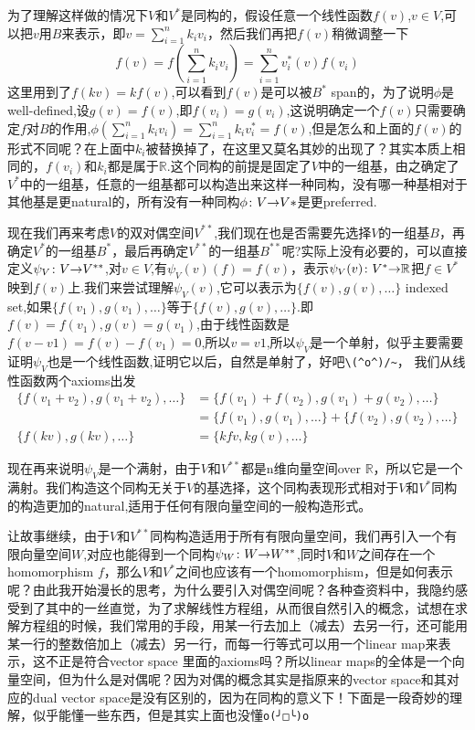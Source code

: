 \documentclass[UTF8,11pt,a4paper]{ctexart}%
\begin{document}
为了理解这样做的情况下$V$和$V^{*}$是同构的，假设任意一个线性函数$f(v)$,$v \in V$,可以把$v$用$B$来表示，即$v=\sum\limits_{i=1}^{n}{k_iv_i}$，然后我们再把$f(v)$稍微调整一下\[f(v)=f\left(\sum\limits_{i=1}^{n}{k_iv_i}\right)=\sum\limits_{i=1}^{n}{v_i^{*}(v)f(v_i)}\]这里用到了$f(kv)=kf(v)$,可以看到$f(v)$是可以被$B^*$ span的，为了说明$\phi$是well-defined,设$g(v)=f(v)$,即$f(v_i)=g(v_i)$,这说明确定一个$f(v)$只需要确定$f$对$B$的作用,$\phi(\sum\limits_{i=1}^{n}{k_iv_i})=\sum\limits_{i=1}^{n}{k_iv_i^{*}}=f(v)$,但是怎么和上面的$f(v)$的形式不同呢？在上面中$k_i$被替换掉了，在这里又莫名其妙的出现了？其实本质上相同的，$f(v_i)$和$k_i$都是属于$\mathbb{R}$.这个同构的前提是固定了$V$中的一组基，由之确定了$V^{*}$中的一组基，任意的一组基都可以构造出来这样一种同构，没有哪一种基相对于其他基是更natural的，所有没有一种同构${\phi}\colon{V}{\to}{V*}$是更preferred.

现在我们再来考虑$V$的双对偶空间$V^{**}$,我们现在也是否需要先选择$V$的一组基$B$，再确定$V^{*}$的一组基$B^{*}$，最后再确定$V^{**}$的一组基$B^{**}$呢?实际上没有必要的，可以直接定义${\psi_{V}}\colon{V}{\to}{V^{**}}$,对$v \in V$,有$\psi_{V}(v)(f)=f(v)$，表示${\psi_{V}(v)}\colon{V^*}{\to}{\mathbb{R}}$把$f \in V^{*}$映到$f(v)$上.我们来尝试理解$\psi_{V}(v)$,它可以表示为$\{f(v),g(v),\ldots\}$ indexed set,如果$\{f(v_1),g(v_1),\ldots\}$等于$\{f(v),g(v),\ldots\}$.即$f(v)=f(v_1),g(v)=g(v_1)$,由于线性函数是$f(v-v1)=f(v)-f(v_1)=0$,所以$v=v1$,所以$\psi_{V}$是一个单射，似乎主要需要证明$\psi_{V}$也是一个线性函数,证明它以后，自然是单射了，好吧\verb|\(^o^)/~|， 我们从线性函数两个axioms出发
	\begin{align*}
		\{f(v_1+v_2),g(v_1+v_2),\ldots\}& =\{f(v_1)+f(v_2),g(v_1)+g(v_2),\ldots\} \\ 
		&=\{f(v_1),g(v_1),\ldots\}+\{f(v_2),g(v_2),\ldots\}\\
		\{f(kv),g(kv),\ldots\} &= \{kf{v},kg(v),\ldots\}	
	\end{align*}

现在再来说明$\psi_{V}$是一个满射，由于$V$和$V^{**}$都是n维向量空间over $\mathbb{R}$，所以它是一个满射。我们构造这个同构无关于$V$的基选择，这个同构表现形式相对于$V$和$V^{*}$同构的构造更加的natural,适用于任何有限向量空间的一般构造形式。


让故事继续，由于$V$和$V^{**}$同构构造适用于所有有限向量空间，我们再引入一个有限向量空间$W$,对应也能得到一个同构${\psi_{W}}\colon{W}{\to}{W^{**}}$,同时$V$和$W$之间存在一个homomorphism $f$，那么$V$和$V^{*}$之间也应该有一个homomorphism，但是如何表示呢？由此我开始漫长的思考，为什么要引入对偶空间呢？各种查资料中，我隐约感受到了其中的一丝直觉，为了求解线性方程组，从而很自然引入的概念，试想在求解方程组的时候，我们常用的手段，用某一行去加上（减去）去另一行，还可能用某一行的整数倍加上（减去）另一行，而每一行等式可以用一个linear map来表示，这不正是符合vector space 里面的axioms吗？所以linear maps的全体是一个向量空间，但为什么是对偶呢？因为对偶的概念其实是指原来的vector space和其对应的dual vector space是没有区别的，因为在同构的意义下！下面是一段奇妙的理解，似乎能懂一些东西，但是其实上面也没懂\verb|o(╯□╰)o|
\end{document}
